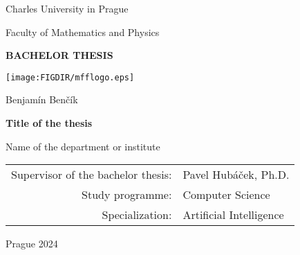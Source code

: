 
\pagestyle{empty}
\begin{center}

{\large Charles University in Prague}

\medskip
{\large Faculty of Mathematics and Physics}

\vfill
{\bfseries\Large BACHELOR THESIS}

\vfill
\centerline{\mbox{\texttt{[image: \\FIGDIR/mfflogo.eps]}}}

\vfill
\vspace{5mm}

{\LARGE Benjamín Benčík}

\vspace{15mm}

{\LARGE\bfseries Title of the thesis}

\vfill

Name of the department or institute

\vfill

\begin{tabular}{rl}
Supervisor of the bachelor thesis: & Pavel Hubáček, Ph.D. \\   
\noalign{\vspace{2mm}}
Study programme: & Computer Science\\
\noalign{\vspace{2mm}}
Specialization: & Artificial Intelligence\\
\end{tabular}

\vfill

Prague 2024

\end{center}


